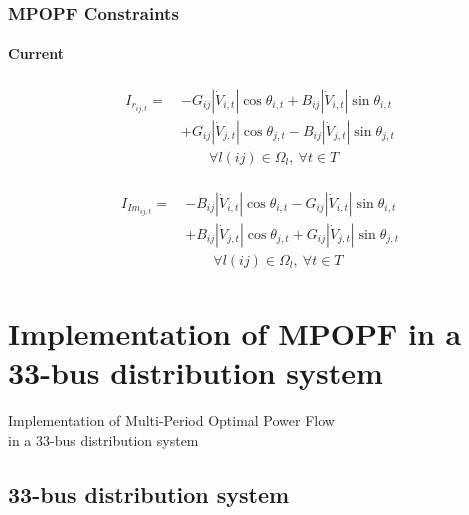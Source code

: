 \documentclass[
	11pt, %
	aspectratio=169, %
]{beamer}
\begin{document}
\begin{frame}
	\frametitle{MPOPF Constraints}
	\framesubtitle{Current} %

	\begin{align}
	\label{eq:Mexpr_i_re}
		\begin{split}
			I_{r_{ij,t}} =\ &-G_{ij}\left\lvert \dot{V}_{i,t} \right\rvert \cos{\theta_{i,t}} + B_{ij}\left\lvert \dot{V}_{i,t} \right\rvert \sin{\theta_{i,t}} \\
					&+ G_{ij}\left\lvert \dot{V}_{j,t} \right\rvert \cos{\theta_{j,t}} - B_{ij}\left\lvert \dot{V}_{j,t} \right\rvert \sin{\theta_{j,t}} \\[1em]
			&\qquad \forall l(ij) \in \Omega_{l},\  \forall t \in T
		\end{split}
	\end{align}

	\begin{align}
	\label{eq:Mexpr_i_imag}
		\begin{split}
			I_{Im_{ij,t}} =\ &-B_{ij}\left\lvert \dot{V}_{i,t} \right\rvert \cos{\theta_{i,t}} - G_{ij}\left\lvert \dot{V}_{i,t} \right\rvert \sin{\theta_{i,t}} \\
			&+ B_{ij}\left\lvert \dot{V}_{j,t} \right\rvert \cos{\theta_{j,t}} + G_{ij}\left\lvert \dot{V}_{j,t} \right\rvert \sin{\theta_{j,t}} \\[1em]
			&\qquad \forall l(ij) \in \Omega_{l},\ \forall t \in T
		\end{split}
	\end{align}

\end{frame}
	

\section{Implementation of MPOPF in a 33-bus distribution system}

\begin{frame}
    \centering
    \LARGE
    Implementation of Multi-Period Optimal Power Flow \\ in a 33-bus distribution system
\end{frame}


\subsection{33-bus distribution system}
\end{document}
